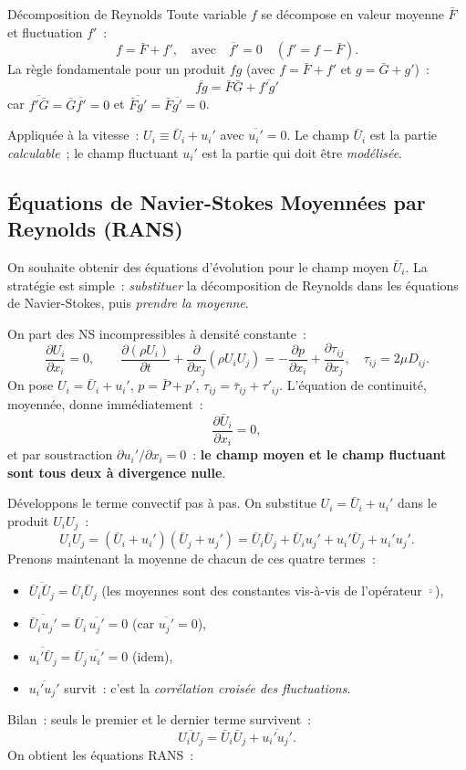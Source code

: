 \documentclass[11pt,a4paper]{report}
\begin{document}
\begin{defbox}{D\'ecomposition de Reynolds}
Toute variable $f$ se d\'ecompose en valeur moyenne $\bar{F}$ et fluctuation $f'$~:
\[
  f = \bar{F} + f', \quad \text{avec} \quad \overline{f'} = 0
  \quad (f' = f - \bar{F}).
\]
La r\`egle fondamentale pour un produit $fg$ (avec $f = \bar{F}+f'$ et $g = \bar{G}+g'$)~:
\[
  \overline{fg} = \bar{F}\bar{G} + \overline{f'g'}
\]
car $\overline{f'\bar{G}} = \bar{G}\overline{f'} = 0$ et $\overline{\bar{F}g'} = \bar{F}\overline{g'} = 0$.
\end{defbox}

Appliqu\'ee \`a la vitesse~: $U_i \equiv \bar{U}_i + u_i'$ avec $\overline{u_i'} = 0$.
Le champ $\bar{U}_i$ est la partie \emph{calculable}~; le champ fluctuant $u_i'$ est la
partie qui doit \^etre \emph{mod\'elis\'ee}.

\subsection{\'Equations de Navier-Stokes Moyenn\'ees par Reynolds (RANS)}

On souhaite obtenir des \'equations d'\'evolution pour le champ moyen $\bar{U}_i$.
La strat\'egie est simple~: \emph{substituer} la d\'ecomposition de Reynolds dans les
\'equations de Navier-Stokes, puis \emph{prendre la moyenne}.

On part des NS incompressibles \`a densit\'e constante~:
\[
  \frac{\partial U_i}{\partial x_i} = 0, \qquad
  \frac{\partial(\rho U_i)}{\partial t} + \frac{\partial}{\partial x_j}(\rho U_i U_j)
  = -\frac{\partial p}{\partial x_i} + \frac{\partial \tau_{ij}}{\partial x_j},
  \quad \tau_{ij} = 2\mu D_{ij}.
\]
On pose $U_i = \bar{U}_i + u_i'$, $p = \bar{P} + p'$, $\tau_{ij} = \bar{\tau}_{ij} + \tau'_{ij}$.
L'\'equation de continuit\'e, moyenn\'ee, donne imm\'ediatement~:
\[
  \frac{\partial\bar{U}_i}{\partial x_i} = 0,
\]
et par soustraction $\partial u_i'/\partial x_i = 0$~: \textbf{le champ moyen et le champ
fluctuant sont tous deux \`a divergence nulle}.

D\'eveloppons le terme convectif pas \`a pas. On substitue $U_i = \bar{U}_i + u_i'$ dans le
produit $U_i U_j$~:
\[
  U_i U_j = (\bar{U}_i + u_i')(\bar{U}_j + u_j')
  = \bar{U}_i\bar{U}_j + \bar{U}_i u_j' + u_i'\bar{U}_j + u_i'u_j'.
\]
Prenons maintenant la moyenne de chacun de ces quatre termes~:
\begin{itemize}
  \item $\overline{\bar{U}_i\bar{U}_j} = \bar{U}_i\bar{U}_j$ (les moyennes sont des constantes vis-\`a-vis de l'op\'erateur $\overline{\cdot}$),
  \item $\overline{\bar{U}_i u_j'} = \bar{U}_i\,\overline{u_j'} = 0$ (car $\overline{u_j'}=0$),
  \item $\overline{u_i'\bar{U}_j} = \bar{U}_j\,\overline{u_i'} = 0$ (idem),
  \item $\overline{u_i'u_j'}$ survit~: c'est la \emph{corr\'elation crois\'ee des fluctuations}.
\end{itemize}
Bilan~: seuls le premier et le dernier terme survivent~:
\[
  \overline{U_i U_j} = \bar{U}_i\bar{U}_j + \overline{u_i'u_j'}.
\]
On obtient les \'equations RANS~:
\end{document}
